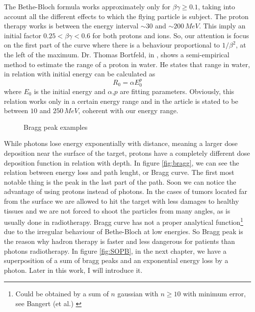 \documentclass[12pt, a4paper, twoside]{book}
\begin{document}
The Bethe-Bloch formula works approximately only for $\beta\gamma\ge 0.1$, taking into account all the different effects to which the flying particle is subject. The proton therapy works is between the energy interval $\sim30$ and $\sim200\,MeV$. This imply an initial factor $0.25<\beta\gamma<0.6$ for both protons and ions. So, our attention is focus on the first part of the curve where there is a behaviour proportional to $1/\beta^2$, at the left of the maximum.
Dr. Thomas Bortfeld, in \cite{bort:bragg}, shows a semi-empirical method to estimate the range of a proton in water. He states that range in water, in relation with initial energy can be calculated as
\[
R_0 = \alpha E_0^p
\]
where $E_0$ is the initial energy and $\alpha$,$p$ are fitting parameters. Obviously, this relation works only in a certain energy range and in the article is stated to be between $10$ and $250\,MeV$, coherent with our energy range.

\begin{figure}[!t]
     \hfill
\hspace{2mm}
\caption{Bragg peak examples}
   \end{figure}
While photons lose energy exponentially with distance, meaning a larger dose deposition near the surface of the target, protons have a completely different dose deposition function in relation with depth.
In figure \ref{fig:bragg}, we can see the relation between energy loss and path lenght, or Bragg curve. The first most notable thing is the peak in the last part of the path. Soon we can notice the advantage of using protons instead of photons. In the cases of tumors located far from the surface we are allowed to hit the target with less damages to healthy tissues and we are not forced to shoot the particles from many angles, as is usually done in radiotherapy.
Bragg curve has not a proper analytical function\footnote{Could be obtained by a sum of $n$ gaussian with $n\geq 10$ with minimum error, see Bangert (et al.) \cite{bang:apm}} due to the irregular behaviour of Bethe-Bloch at low energies. So Bragg peak is the reason why hadron therapy is faster and less dangerous for patients than photons radiotherapy. 
In figure \ref{fig:SOPB}, in the next chapter, we have a superposition of a sum of bragg peaks and an exponential energy loss by a photon. Later in this work, I will introduce it.
\end{document}
